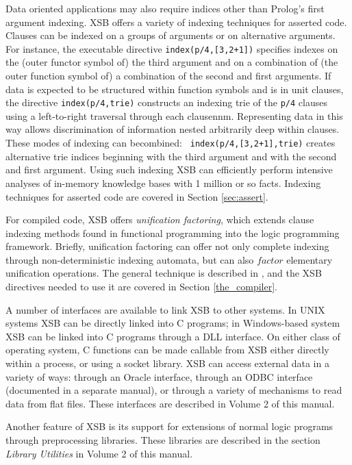 Data oriented applications may also require indices other than
Prolog's first argument indexing.  XSB offers a variety of indexing
techniques for asserted code.  Clauses can be indexed on a groups of
arguments or on alternative arguments.  For instance, the executable
directive {\tt index(p/4,[3,2+1])} specifies indexes on the (outer
functor symbol of) the third argument and on a combination of (the
outer function symbol of) a combination of the second and first
arguments.  If data is expected to be structured within function
symbols and is in unit clauses, the directive {\tt index(p/4,trie)}
constructs an indexing trie of the {\tt p/4} clauses using a
left-to-right traversal through each clausennm.  Representing data in
this way allows discrimination of information nested arbitrarily deep
within clauses.  These modes of indexing can becombined: {\tt
index(p/4,[3,2+1],trie)} creates alternative trie indices beginning
with the third argument and with the second and first argument.  Using
such indexing XSB can efficiently perform intensive analyses of
in-memory knowledge bases with 1 million or so facts.  Indexing
techniques for asserted code are covered in Section
\ref{sec:assert}.

For compiled code, XSB offers {\em unification factoring}, which
extends clause indexing methods found in functional programming into
the logic programming framework.  Briefly, unification factoring can
offer not only complete indexing through non-deterministic indexing
automata, but can also $factor$ elementary unification operations.
The general technique is described in \cite{DRRSSSW95}, and the XSB
directives needed to use it are covered in Section
\ref{the_compiler}.

A number of interfaces are available to link XSB to other systems.
In UNIX systems XSB can be directly linked into C programs; in
Windows-based system XSB can be linked into C programs through a DLL
interface.  On either class of operating system, C functions can be
made callable from XSB either directly within a process, or using a
socket library.  XSB can access external data in a variety of ways:
through an Oracle interface, through an ODBC interface (documented in
a separate manual), or through a variety of mechanisms to read data
from flat files.  These interfaces are described in Volume 2 of this manual.

Another feature of XSB is its support for extensions of normal logic
programs through preprocessing libraries.  These libraries are
described in the section {\it Library Utilities} in Volume 2 of this
manual. 

